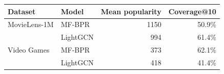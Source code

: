 \begin{tabular}{llrr}
\toprule
Dataset & Model & Mean popularity & Coverage@10 \\
\midrule
MovieLens-1M & MF-BPR & 1150 & 50.9\% \\
 & LightGCN & 994 & 61.4\% \\
\midrule
Video Games & MF-BPR & 373 & 62.1\% \\
 & LightGCN & 418 & 41.4\% \\
\bottomrule
\end{tabular}
